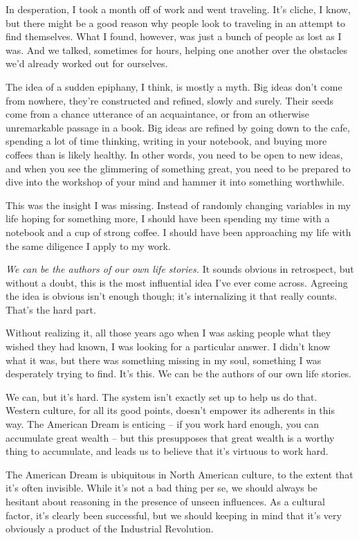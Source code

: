 \documentclass[./the-millions-of-gestures.tex]{subfiles}
\begin{document}
In desperation, I took a month off of work and went traveling. It's cliche, I
know, but there might be a good reason why people look to traveling in an
attempt to find themselves. What I found, however, was just a bunch of people as
lost as I was. And we talked, sometimes for hours, helping one another over the
obstacles we'd already worked out for ourselves.

The idea of a sudden epiphany, I think, is mostly a myth. Big ideas don't come
from nowhere, they're constructed and refined, slowly and surely. Their seeds
come from a chance utterance of an acquaintance, or from an otherwise
unremarkable passage in a book. Big ideas are refined by going down to the cafe,
spending a lot of time thinking, writing in your notebook, and buying more
coffees than is likely healthy.  In other words, you need to be open to new
ideas, and when you see the glimmering of something great, you need to be
prepared to dive into the workshop of your mind and hammer it into something
worthwhile.

This was the insight I was missing. Instead of randomly changing variables in my
life hoping for something more, I should have been spending my time with a
notebook and a cup of strong coffee. I should have been approaching my life with
the same diligence I apply to my work.

\emph{We can be the authors of our own life stories.} It sounds obvious in
retrospect, but without a doubt, this is the most influential idea I've ever
come across. Agreeing the idea is obvious isn't enough though; it's
internalizing it that really counts. That's the hard part.

Without realizing it, all those years ago when I was asking people what they
wished they had known, I was looking for a particular answer. I didn't know what
it was, but there was something missing in my soul, something I was desperately
trying to find. It's this. We can be the authors of our own life stories.

We can, but it's hard. The system isn't exactly set up to help us do that.
Western culture, for all its good points, doesn't empower its adherents in this
way.  The American Dream is enticing -- if you work hard
enough, you can accumulate great wealth -- but this presupposes that great
wealth is a worthy thing to accumulate, and leads us to believe that it's
virtuous to work hard.

The American Dream is ubiquitous in North American culture, to the extent that
it's often invisible. While it's not a bad thing per se, we should
always be hesitant about reasoning in the presence of unseen influences. As a
cultural factor, it's clearly been successful, but we should keeping in mind
that it's very obviously a product of the Industrial Revolution.
\end{document}
